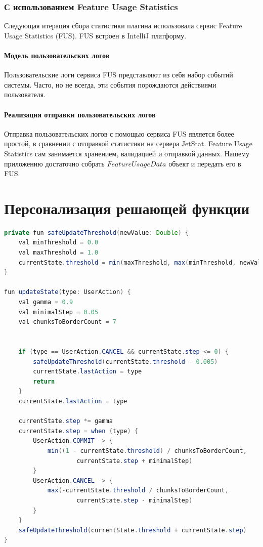 \documentclass[times]{itmo-student-thesis}
\begin{document}
\subsection{С использованием Feature Usage Statistics}\label{fus-main}
Следующая итерация сбора статистики плагина использовала сервис Feature Usage Statistics (FUS). FUS встроен в IntelliJ платформу.
\subsubsection{Модель пользовательских логов}
Пользовательские логи сервиса FUS представляют из себя набор событий системы. Часто, но не всегда, эти события порождаются действиями пользователя.
\subsubsection{Реализация отправки пользовательских логов}
Отправка пользовательских логов с помощью сервиса FUS является более простой, в сравнении с отправкой статистики на сервера JetStat. Feature Usage Statistics сам занимается хранением, валидацией и отправкой данных. Нашему приложению достаточно собрать $FeatureUsageData$ объект и передать его в FUS.
\printmainbibliography

\appendix

\chapter{Персонализация решающей функции}
\begin{lstlisting}[caption={Персонализация решающей функции},label={personalization}, language=Java, tabsize=2, basicstyle=\fontsize{10}{10}\selectfont\ttfamily]
private fun safeUpdateThreshold(newValue: Double) {
    val minThreshold = 0.0
    val maxThreshold = 1.0
    currentState.threshold = min(maxThreshold, max(minThreshold, newValue))
}

fun updateState(type: UserAction) {
    val gamma = 0.9
    val minimalStep = 0.05
    val chunksToBorderCount = 7


    if (type == UserAction.CANCEL && currentState.step <= 0) {
        safeUpdateThreshold(currentState.threshold - 0.005)
        currentState.lastAction = type
        return
    }
    currentState.lastAction = type

    currentState.step *= gamma
    currentState.step = when (type) {
        UserAction.COMMIT -> {
            min((1 - currentState.threshold) / chunksToBorderCount,
                    currentState.step + minimalStep)
        }
        UserAction.CANCEL -> {
            max(-currentState.threshold / chunksToBorderCount,
                    currentState.step - minimalStep)
        }
    }
    safeUpdateThreshold(currentState.threshold + currentState.step)
}
\end{lstlisting}
\end{document}
